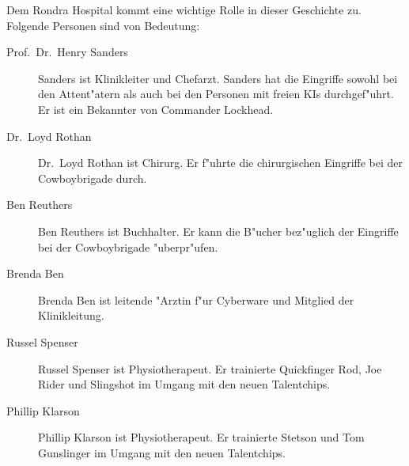 
Dem Rondra Hospital kommt eine wichtige Rolle in dieser Geschichte zu. Folgende Personen sind von Bedeutung:

\begin{description}
    \item[Prof.~Dr.~Henry Sanders] Sanders ist Klinikleiter und Chefarzt. Sanders hat die Eingriffe sowohl bei den Attent"atern als auch 
        bei den Personen mit freien KIs durchgef"uhrt. Er ist ein Bekannter von Commander Lockhead.
    \item[Dr.~Loyd Rothan] Dr.~Loyd Rothan ist Chirurg. Er f"uhrte die chirurgischen Eingriffe bei der Cowboybrigade durch.
    \item[Ben Reuthers] Ben Reuthers ist Buchhalter. Er kann die B"ucher bez"uglich der Eingriffe bei der Cowboybrigade "uberpr"ufen.
    \item[Brenda Ben] Brenda Ben ist leitende "Arztin f"ur Cyberware und Mitglied der Klinikleitung.
    \item[Russel Spenser] Russel Spenser ist Physiotherapeut. Er trainierte Quickfinger Rod, Joe Rider und Slingshot im Umgang mit den 
        neuen Talentchips.
    \item[Phillip Klarson] Phillip Klarson ist Physiotherapeut. Er trainierte Stetson und Tom Gunslinger im Umgang mit den neuen 
        Talentchips.
\end{description}
